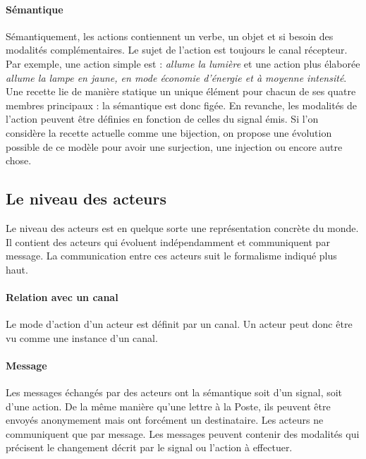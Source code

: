 \documentclass[11pt]{article}
\begin{document}
\paragraph{Sémantique} Sémantiquement, les actions contiennent un verbe, un objet et si besoin des modalités complémentaires. Le sujet de l'action est toujours le canal récepteur. Par exemple, une action simple est : \textsl{allume la lumière} et une action plus élaborée \textsl{allume la lampe en jaune, en mode économie d'énergie et à moyenne intensité}. Une recette lie de manière statique un unique élément pour chacun de ses quatre membres principaux : la sémantique est donc figée. En revanche, les modalités de l'action peuvent être définies en fonction de celles du signal émis. Si l'on considère la recette actuelle comme une bijection, on propose une évolution possible de ce modèle pour avoir une surjection, une injection ou encore autre chose.

\subsection{Le niveau des acteurs} Le niveau des acteurs est en quelque sorte une représentation concrète du monde. Il contient des acteurs qui évoluent indépendamment et communiquent par message. La communication entre ces acteurs suit le formalisme indiqué plus haut.

\paragraph{Relation avec un canal} Le mode d'action d'un acteur est définit par un canal. Un acteur peut donc être vu comme une instance d'un canal.

\paragraph{Message} Les messages échangés par des acteurs ont la sémantique soit d'un signal, soit d'une action. De la même manière qu'une lettre à la Poste, ils peuvent être envoyés anonymement mais ont forcément un destinataire. Les acteurs ne communiquent que par message. Les messages peuvent contenir des modalités qui précisent le changement décrit par le signal ou l'action à effectuer.
\end{document}
